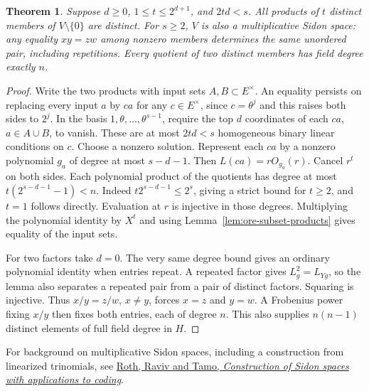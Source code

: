 \documentclass[11pt]{article}
\newtheorem{theorem}{Theorem}
\begin{document}
\begin{theorem}\label{thm:scaled-separation}
Suppose \(d\ge0\), \(1\le t\le 2^{d+1}\), and \(2td<s\).
All products of \(t\) distinct members of \(V\setminus\{0\}\) are
distinct. For \(s\ge2\), \(V\) is also a multiplicative Sidon space:
any equality \(xy=zw\) among nonzero members determines the same
unordered pair, including repetitions. Every quotient of two distinct
members has field degree exactly \(n\).
\end{theorem}
\begin{proof}
Write the two products with input sets \(A,B\subset E^\times\).
An equality persists on replacing every input \(a\) by \(ca\)
for any \(c\in E^\times\), since \(c=\theta^j\) and this raises
both sides to \(2^j\). In the basis \(1,\theta,\ldots,\theta^{s-1}\),
require the top \(d\) coordinates of each \(ca\), \(a\in A\cup B\),
to vanish. These are at most \(2td<s\) homogeneous binary linear
conditions on \(c\). Choose a nonzero solution. Represent each
\(ca\) by a nonzero polynomial \(g_a\) of degree at most \(s-d-1\).
Then \(L(ca)=rO_{g_a}(r)\). Cancel \(r^t\) on both sides.
Each polynomial product of the quotients has degree at most
\(t(2^{s-d-1}-1)<n\). Indeed \(t2^{s-d-1}\le2^s\), giving a
strict bound for \(t\ge2\), and \(t=1\) follows directly.
Evaluation at \(r\) is injective in those degrees. Multiplying
the polynomial identity by \(X^t\) and using
Lemma~\ref{lem:ore-subset-products} gives equality of the input sets.

For two factors take \(d=0\). The very same degree bound gives an
ordinary polynomial identity when entries repeat. A repeated factor
gives \(L_g^2=L_{Yg}\), so the lemma also separates a repeated pair
from a pair of distinct factors. Squaring is injective.
Thus \(x/y=z/w\), \(x\ne y\), forces \(x=z\) and \(y=w\). A
Frobenius power fixing \(x/y\) then fixes both entries, each of
degree \(n\). This also supplies \(n(n-1)\) distinct elements of
full field degree in \(H\).
\end{proof}
For background on multiplicative Sidon spaces, including a construction
from linearized trinomials, see
\href{https://ronny.cswp.cs.technion.ac.il/wp-content/uploads/sites/54/2017/11/sidon.pdf}
{Roth, Raviv and Tamo, \emph{Construction of Sidon spaces with applications to coding}}.
\end{document}
